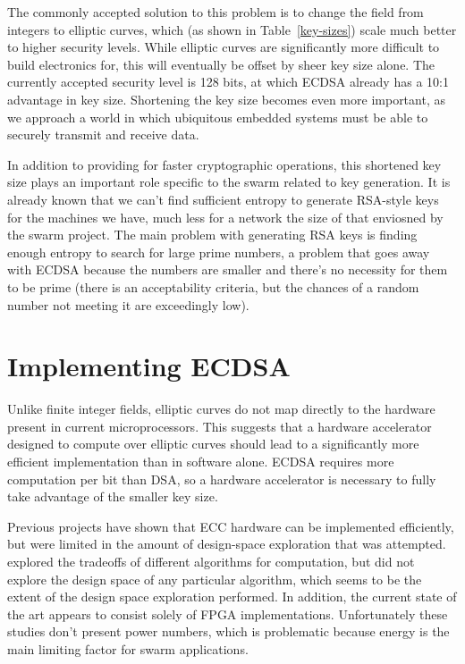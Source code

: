 \documentclass[twocolumn]{article}
\begin{document}
The commonly accepted solution to this problem is to change the field
from integers to elliptic curves, which (as shown in
Table~\ref{key-sizes}) scale much better to higher security levels.
While elliptic curves are significantly more difficult to build
electronics for, this will eventually be offset by sheer key size
alone.  The currently accepted security level is 128 bits, at which
ECDSA already has a 10:1 advantage in key size.  Shortening the key 
size becomes even more important, as we approach a world in which 
ubiquitous embedded systems must be able to securely transmit and 
receive data.

In addition to providing for faster cryptographic operations, this
shortened key size plays an important role specific to the swarm
related to key generation.  It is already known\cite{halderman-shared}
that we can't find sufficient entropy to generate RSA-style keys for
the machines we have, much less for a network the size of that
enviosned by the swarm project.  The main problem with generating RSA
keys is finding enough entropy to search for large prime numbers, a
problem that goes away with ECDSA because the numbers are smaller and
there's no necessity for them to be prime (there is an acceptability
criteria, but the chances of a random number not meeting it are
exceedingly low).

\section{Implementing ECDSA}

Unlike finite integer fields, elliptic curves do not map directly to
the hardware present in current microprocessors\cite{kss-ecdsa}. This
suggests that a hardware accelerator designed to compute over elliptic
curves should lead to a significantly more efficient implementation
than in software alone.  ECDSA requires more computation per bit than
DSA, so a hardware accelerator is necessary to fully take advantage of
the smaller key size.

Previous projects\cite{nnll-ecdsa_hw} have shown that ECC hardware can
be implemented efficiently, but were limited in the amount of
design-space exploration that was attempted.  \cite{mmm-hw_ecc}
explored the tradeoffs of different algorithms for computation, but
did not explore the design space of any particular algorithm, which
seems to be the extent of the design space exploration performed.  In
addition, the current state of the art appears to consist solely of
FPGA implementations.  Unfortunately these studies don't present power
numbers, which is problematic because energy is the main limiting
factor for swarm applications.
\end{document}
